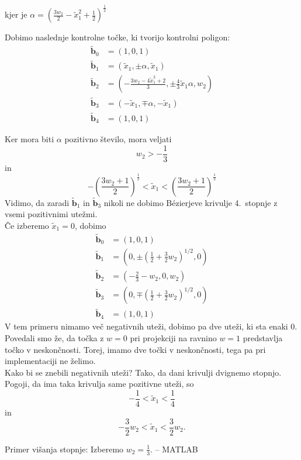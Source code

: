 \documentclass[a4paper,11pt]{article}
\theoremstyle{definition}
\theoremstyle{plain}
\begin{document}
kjer je $\alpha=(\frac{3w_2}{2}-\tilde{x}_1^2+\frac{1}{2})^{\frac{1}{2}}$

Dobimo naslednje kontrolne točke, ki tvorijo kontrolni poligon:
\begin{align*}
\boldsymbol{\tilde{b}}_0 &= (1,0,1) \\
\boldsymbol{\tilde{b}}_1 &= (\tilde{x}_1,\pm\alpha,\tilde{x}_1) \\
\boldsymbol{\tilde{b}}_2 &= (-\frac{3w_2-4\tilde{x}_1^2+2}{3},\pm\frac{4}{3}\tilde{x}_1\alpha,w_2) \\
\boldsymbol{\tilde{b}}_3 &= (-\tilde{x}_1,\mp\alpha,-\tilde{x}_1) \\
\boldsymbol{\tilde{b}}_4 &= (1,0,1)
\end{align*}

Ker mora biti $\alpha$ pozitivno število, mora veljati
$$w_2>-\frac{1}{3}$$
in
$$-\left(\frac{3w_2+1}{2}\right)^{\frac{1}{2}}<\tilde{x}_1<\left(\frac{3w_2+1}{2}\right)^{\frac{1}{2}}$$
Vidimo, da zaradi $\boldsymbol{\tilde{b}}_1$ in $\boldsymbol{\tilde{b}}_3$ nikoli ne dobimo B\'ezierjeve krivulje 4.~stopnje z vsemi pozitivnimi utežmi. \\
Če izberemo $\tilde{x}_1=0$, dobimo  
\begin{align*}
\boldsymbol{\tilde{b}}_0 &= (1,0,1) \\
\boldsymbol{\tilde{b}}_1 &= (0,\pm (\frac{1}{2}+\frac{3}{2}w_2)^{1/2},0) \\
\boldsymbol{\tilde{b}}_2 &= (-\frac{2}{3}-w_2,0,w_2) \\
\boldsymbol{\tilde{b}}_3 &= (0,\mp(\frac{1}{2}+\frac{3}{2}w_2)^{1/2},0) \\
\boldsymbol{\tilde{b}}_4 &= (1,0,1)
\end{align*}
V tem primeru nimamo več negativnih uteži, dobimo pa dve uteži, ki sta enaki $0$. Povedali smo že, da točka z $w=0$ pri projekciji na ravnino $w=1$ predstavlja točko v neskončnosti. Torej, imamo dve točki v neskončnosti, tega pa pri implementaciji ne želimo. \\
Kako bi se znebili negativnih uteži? Tako, da dani krivulji dvignemo stopnjo. \\%
Pogoji, da ima taka krivulja same pozitivne uteži, so
$$-\frac{1}{4}<\tilde{x}_1<\frac{1}{4}$$
in
$$-\frac{3}{2}w_2<\tilde{x}_1<\frac{3}{2}w_2.$$

\noindent
Primer višanja stopnje: Izberemo $w_2=\frac{1}{3}$. -- MATLAB

\end{document}
